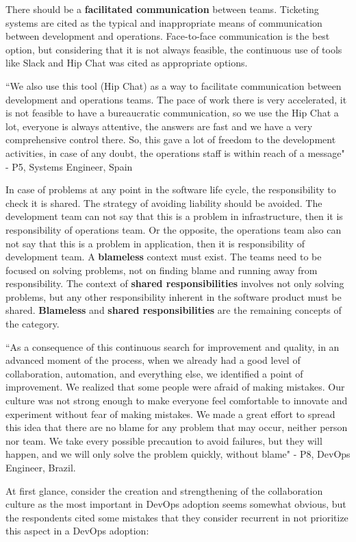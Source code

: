 There should be a \textbf{facilitated communication} between teams. Ticketing
systems are cited as the typical and inappropriate means of communication
between development and operations. Face-to-face communication is the best
option, but considering that it is not always feasible, the continuous use of
tools like Slack and Hip Chat was cited as appropriate options.

``We also use this tool (Hip Chat) as a way to facilitate communication between
development and operations teams. The pace of work there is very accelerated,
it is not feasible to have a bureaucratic communication, so we use the Hip Chat
a lot, everyone is always attentive, the answers are fast and we have a very
comprehensive control there. So, this gave a lot of freedom to the development
activities, in case of any doubt, the operations staff is within reach of a
message" - P5, Systems Engineer, Spain

In case of problems at any point in the software life cycle, the responsibility
to check it is shared. The strategy of avoiding liability should be avoided.
The development team can not say that this is a problem in infrastructure, then
it is responsibility of operations team. Or the opposite, the operations team
also can not say that this is a problem in application, then it is
responsibility of development team. A \textbf{blameless} context must exist.
The teams need to be focused on solving problems, not on finding blame and
running away from responsibility. The context of \textbf{shared
responsibilities} involves not only solving problems, but any other
responsibility inherent in the software product must be shared.
\textbf{Blameless} and \textbf{shared responsibilities} are the remaining
concepts of the category.

``As a consequence of this continuous search for improvement and quality, in an
advanced moment of the process, when we already had a good level of
collaboration, automation, and everything else, we identified a point of
improvement. We realized that some people were afraid of making mistakes. Our
culture was not strong enough to make everyone feel comfortable to innovate and
experiment without fear of making mistakes. We made a great effort to spread
this idea that there are no blame for any problem that may occur, neither
person nor team. We take every possible precaution to avoid failures, but they
will happen, and we will only solve the problem quickly, without blame" - P8,
DevOps Engineer, Brazil.

At first glance, consider the creation and strengthening of the collaboration
culture as the most important in DevOps adoption seems somewhat obvious, but
the respondents cited some mistakes that they consider recurrent in not
prioritize this aspect in a DevOps adoption:

